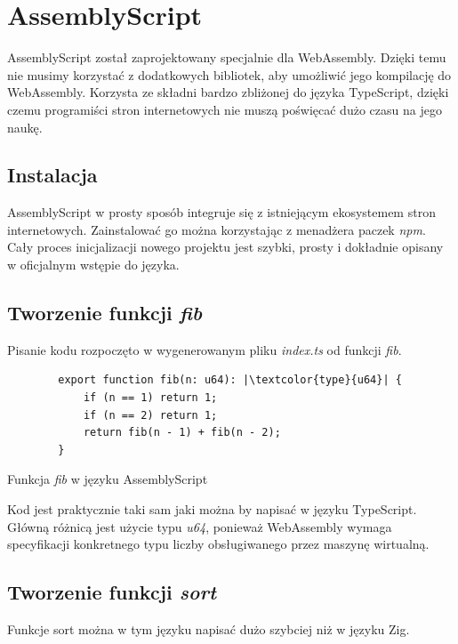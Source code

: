 \documentclass[language=polish,type=master]{aghmodern}
\begin{document}
\section{AssemblyScript}
AssemblyScript został zaprojektowany specjalnie dla WebAssembly.
Dzięki temu nie musimy korzystać z dodatkowych bibliotek, aby umożliwić jego kompilację do WebAssembly.
Korzysta ze składni bardzo zbliżonej do języka TypeScript, dzięki czemu programiści stron internetowych nie muszą poświęcać dużo czasu na jego naukę.

\subsection{Instalacja}
AssemblyScript w prosty sposób integruje się z istniejącym ekosystemem stron internetowych.
Zainstalować go można korzystając z menadżera paczek \emph{npm}.
Cały proces inicjalizacji nowego projektu jest szybki, prosty i dokładnie opisany w oficjalnym wstępie do języka\footnotemark{}.

\subsection{Tworzenie funkcji \emph{fib}}
Pisanie kodu rozpoczęto w wygenerowanym pliku \emph{index.ts} od funkcji \emph{fib}.

\begin{listing}[H]
    \begin{verbatim}
        export function fib(n: u64): |\textcolor{type}{u64}| {
            if (n == 1) return 1;
            if (n == 2) return 1;
            return fib(n - 1) + fib(n - 2);
        }
    \end{verbatim}
    \caption{Funkcja \emph{fib} w języku AssemblyScript}
\end{listing}

Kod jest praktycznie taki sam jaki można by napisać w języku TypeScript.
Główną różnicą jest użycie typu \emph{u64}, ponieważ WebAssembly wymaga specyfikacji konkretnego typu liczby obsługiwanego przez maszynę wirtualną.

\subsection{Tworzenie funkcji \emph{sort}}

Funkcje sort można w tym języku napisać dużo szybciej niż w języku Zig.
\end{document}
